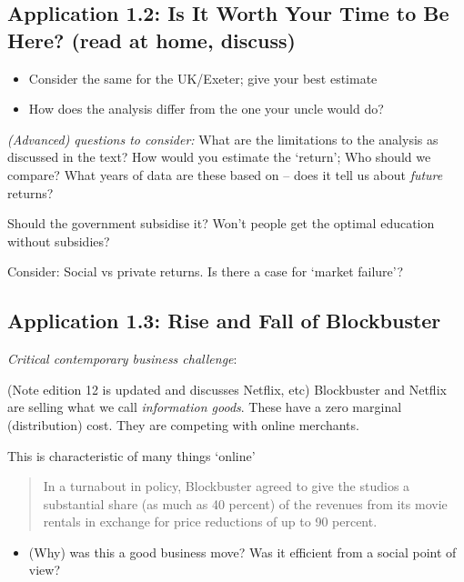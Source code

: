 \documentclass[]{article}
\providecommand{\tightlist}{%
  \setlength{\itemsep}{0pt}\setlength{\parskip}{0pt}}
\begin{document}
\hypertarget{application-1.2-is-it-worth-your-time-to-be-here-read-at-home-discuss}{%
\subsection{Application 1.2: Is It Worth Your Time to Be Here? (read at
home,
discuss)}\label{application-1.2-is-it-worth-your-time-to-be-here-read-at-home-discuss}}

\begin{itemize}
\item
  Consider the same for the UK/Exeter; give your best estimate
\item
  How does the analysis differ from the one your uncle would do?
\end{itemize}

\emph{(Advanced) questions to consider:} What are the limitations to the
analysis as discussed in the text? How would you estimate the `return';
Who should we compare? What years of data are these based on -- does it
tell us about \emph{future} returns?

Should the government subsidise it? Won't people get the optimal
education without subsidies?

Consider: Social vs private returns. Is there a case for `market
failure'?

\hypertarget{application-1.3-rise-and-fall-of-blockbuster}{%
\subsection{Application 1.3: Rise and Fall of
Blockbuster}\label{application-1.3-rise-and-fall-of-blockbuster}}

\emph{Critical contemporary business challenge}:

(Note edition 12 is updated and discusses Netflix, etc) Blockbuster and
Netflix are selling what we call \emph{information goods}. These have a
zero marginal (distribution) cost. They are competing with online
merchants.

This is characteristic of many things `online'

\begin{quote}
In a turnabout in policy, Blockbuster agreed to give the studios a
substantial share (as much as 40 percent) of the revenues from its movie
rentals in exchange for price reductions of up to 90 percent.
\end{quote}

\begin{itemize}
\tightlist
\item
  (Why) was this a good business move? Was it efficient from a social
  point of view?
\end{itemize}
\end{document}
